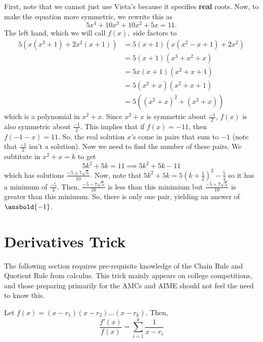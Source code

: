 \documentclass{article}
\begin{document}
\begin{sol}
First, note that we cannot just use Vieta\rq{}s because it specifies \textbf{real} roots. Now, to make the equation more symmetric, we rewrite this as \[5x^4+10x^3+10x^2+5x=11.\] The left hand, which we will call $f(x),$ side factors to
\begin{align*}
5(x(x^3+1)+2x^2(x+1))&=5(x+1)(x(x^2-x+1)+2x^2) \\
&=5(x+1)(x^3+x^2+x) \\
&=5x(x+1)(x^2+x+1) \\
&=5(x^2+x)(x^2+x+1) \\
&=5((x^2+x)^2+(x^2+x))
\end{align*} which is a polynomial in $x^2+x$. Since $x^2+x$ is symmetric about $\frac{-1}{2}$, $f(x)$ is also symmetric about $\frac{-1}{2}$. This implies that if $f(x)=-11$, then $f(-1-x)=11$. So, the real solution $x$\rq{}s come in pairs that sum to $-1$ (note that $\frac{-1}{2}$ isn\rq{}t a solution). Now we need to find the number of these pairs. We subtitute in $x^2+x=k$ to get \[5k^2+5k=11\implies 5k^2+5k-11\] which has solutions $\frac{-5 \pm 7\sqrt{5}}{10}$. Now, note that $5k^2+5k=5(k+\frac{1}{2})^2-\frac{5}{4}$ so it has a minimum of $\frac{-5}{4}$. Then, $\frac{-5-7\sqrt{5}}{10}$ is less than this minimium but $\frac{-5+7\sqrt{5}}{10}$ is greater than this minimum. So, there is only one pair, yielding an answer of $\ansbold{-1}$.
\end{sol}

\newpage
\section{Derivatives Trick}

The following section requires pre-requisite knowledge of the Chain Rule and Quotient Rule from calculus. This trick mainly appears on college competitions, and those preparing primarily for the AMCs and AIME should not feel the need to know this.

\begin{theo}
Let $f(x)=(x-r_{1})(x-r_{2})\ldots(x-r_{k})$. Then,
$$\frac{f'(x)}{f(x)} = \sum_{i=1}^{k} \frac{1}{x-r_{i}}$$
\end{theo}
\end{document}
